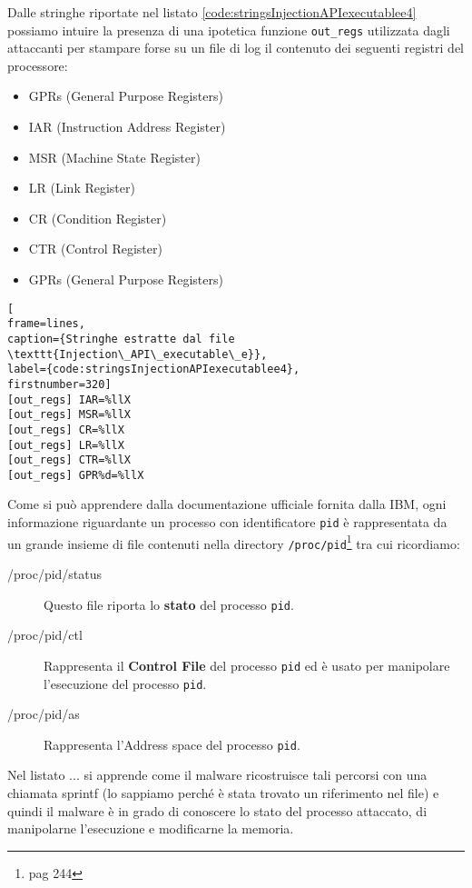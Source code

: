 \documentclass[10pt,a4paper, titlepage]{report}
\begin{document}
Dalle stringhe riportate nel listato \ref{code:stringsInjectionAPIexecutablee4} possiamo intuire la presenza di una ipotetica funzione \texttt{out\_regs} utilizzata dagli attaccanti per stampare forse su un file di log il contenuto dei seguenti registri del processore:
\begin{itemize}
\item GPRs (General Purpose Registers)
\item IAR (Instruction Address Register)
\item MSR (Machine State Register)
\item LR (Link Register)
\item CR (Condition Register)
\item CTR (Control Register)
\item GPRs (General Purpose Registers)
\end{itemize}

\begin{lstlisting}[
frame=lines, 
caption={Stringhe estratte dal file \texttt{Injection\_API\_executable\_e}}, 
label={code:stringsInjectionAPIexecutablee4},
firstnumber=320]
[out_regs] IAR=%llX
[out_regs] MSR=%llX
[out_regs] CR=%llX
[out_regs] LR=%llX
[out_regs] CTR=%llX
[out_regs] GPR%d=%llX
\end{lstlisting}

Come si può apprendere dalla documentazione ufficiale fornita dalla IBM, ogni informazione riguardante un processo con identificatore \texttt{pid} è rappresentata da un grande insieme di file contenuti nella directory \texttt{/proc/pid}\footnote{pag 244} tra cui ricordiamo:

\begin{description}
\item[/proc/pid/status] Questo file riporta lo \textbf{stato} del processo \texttt{pid}.
\item[/proc/pid/ctl] Rappresenta il \textbf{Control File} del processo \texttt{pid} ed è usato per manipolare l'esecuzione del processo \texttt{pid}.
\item[/proc/pid/as] Rappresenta l'Address space del processo \texttt{pid}.
\end{description}

Nel listato ... si apprende come il malware ricostruisce tali percorsi con una chiamata sprintf (lo sappiamo perché è stata trovato un riferimento nel file) e quindi il malware è in grado di conoscere lo stato del processo attaccato, di manipolarne l'esecuzione e modificarne la memoria.
\end{document}
